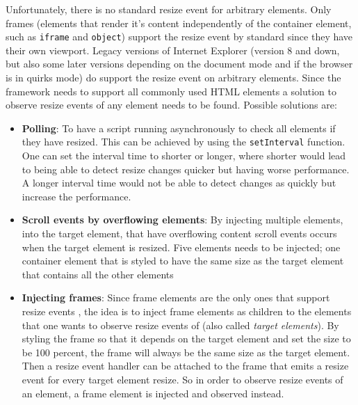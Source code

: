 \documentclass[a4paper,11pt]{kth-mag}
\newcommand{\code}[1]{\texttt{#1}}
\begin{document}
          Unfortunately, there is no standard resize event for arbitrary \glspl{element}.
          Only frames (\glspl{element} that render it's content independently of the container \gls{element}, such as \code{iframe} and \code{object}) support the resize event by standard since they have their own \gls{viewport}.
          Legacy versions of Internet Explorer (version 8 and down, but also some later versions depending on the \gls{document} mode and if the \gls{browser} is in quirks mode) do support the resize event on arbitrary \glspl{element}.
          Since the framework needs to support all commonly used \gls{HTML} \glspl{element} a solution to observe resize events of any \gls{element} needs to be found.
          Possible solutions are:
          \begin{itemize}
            \item \textbf{Polling}:
              To have a script running asynchronously to check all \glspl{element} if they have resized.
              This can be achieved by using the \code{setInterval} function.
              One can set the interval time to shorter or longer, where shorter would lead to being able to detect resize changes quicker but having worse performance.
              A longer interval time would not be able to detect changes as quickly but increase the performance.
            \item \textbf{Scroll events by overflowing \glspl{element}}:
              By injecting multiple \glspl{element}, into the target \gls{element}, that have overflowing content scroll events occurs when the target \gls{element} is resized.
              Five \glspl{element} needs to be injected; one container \gls{element} that is styled to have the same size as the target \gls{element} that contains all the other \glspl{element}
            \item \textbf{Injecting frames}:
              Since frame \glspl{element} are the only ones that support resize events , the idea is to inject frame \glspl{element} as children to the \glspl{element} that one wants to observe resize events of (also called \emph{target \glspl{element}}).
              By styling the frame so that it depends on the target \gls{element} and set the size to be 100 percent, the frame will always be the same size as the target element.
              Then a resize event handler can be attached to the frame that emits a resize event for every target \gls{element} resize.
              So in order to observe resize events of an element, a frame \gls{element} is injected and observed instead.
          \end{itemize}
\end{document}
